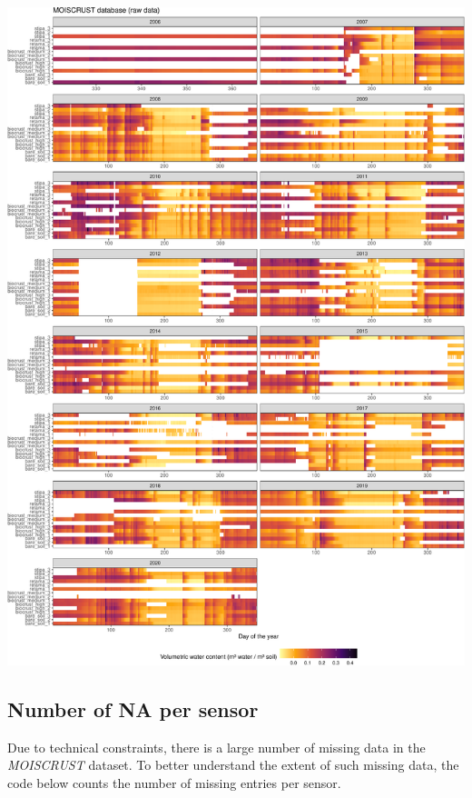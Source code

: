 \documentclass[
  table]{article}
\begin{document}
\includegraphics{moiscrust_files/figure-latex/unnamed-chunk-7-1.pdf}

\hypertarget{number-of-na-per-sensor}{%
\subsection{Number of NA per sensor}\label{number-of-na-per-sensor}}

Due to technical constraints, there is a large number of missing data in
the \emph{MOISCRUST} dataset. To better understand the extent of such
missing data, the code below counts the number of missing entries per
sensor.
\end{document}
